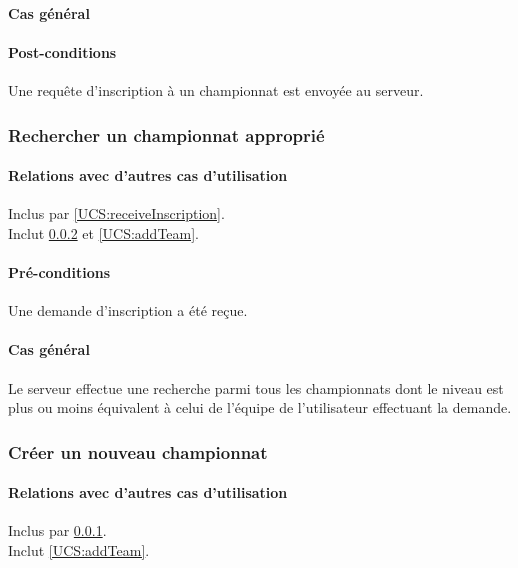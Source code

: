 \paragraph{Cas général}
\paragraph{Post-conditions}
\begin{list}{}{\leftmargin=1.5em}
\item{Une requête d'inscription à un championnat est envoyée au serveur.}
\end{list}

\subsubsection{Rechercher un championnat approprié}
\label{UCS:searchChampionship}
\paragraph{Relations avec d'autres cas d'utilisation}
Inclus par \ref{UCS:receiveInscription}.\\
Inclut \ref{UCS:createChampionship} et \ref{UCS:addTeam}.
\paragraph{Pré-conditions}
\begin{list}{}{\leftmargin=1.5em}
\item{Une demande d'inscription a été reçue.}
\end{list}
\paragraph{Cas général}
Le serveur effectue une recherche parmi tous les championnats dont le niveau est plus ou moins équivalent à celui de l'équipe de l'utilisateur effectuant la demande.

\subsubsection{Créer un nouveau championnat}
\label{UCS:createChampionship}
\paragraph{Relations avec d'autres cas d'utilisation}
Inclus par \ref{UCS:searchChampionship}.\\
Inclut \ref{UCS:addTeam}.
